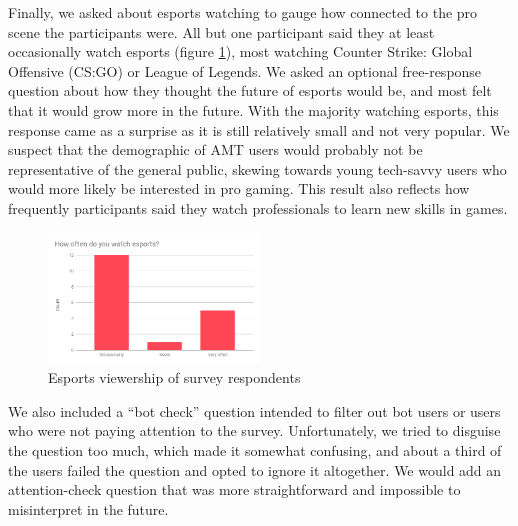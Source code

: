 \documentclass[11pt,manuscript,screen,review]{acmart} %
\begin{document}

Finally, we asked about esports watching to gauge how connected to the pro scene the participants were. All but one participant said they at least occasionally watch esports (figure \ref{fig:amt-esports}), most watching Counter Strike: Global Offensive (CS:GO) or League of Legends. We asked an optional free-response question about how they thought the future of esports would be, and most felt that it would grow more in the future. With the majority watching esports, this response came as a surprise as it is still relatively small and not very popular. We suspect that the demographic of AMT users would probably not be representative of the general public, skewing towards young tech-savvy users who would more likely be interested in pro gaming. This result also reflects how frequently participants said they watch professionals to learn new skills in games.

\begin{figure}[h]
    \centering
    \includegraphics[width=0.5\textwidth]{img/amt-esports.png}
    \caption{Esports viewership of survey respondents}
    \label{fig:amt-esports}
\end{figure}

We also included a “bot check” question intended to filter out bot users or users who were not paying attention to the survey. Unfortunately, we tried to disguise the question too much, which made it somewhat confusing, and about a third of the users failed the question and opted to ignore it altogether. We would add an attention-check question that was more straightforward and impossible to misinterpret in the future. 
\end{document}
